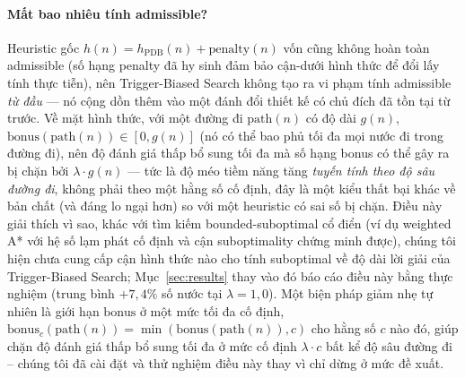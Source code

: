 \documentclass[10pt,conference]{article}
\begin{document}
\paragraph{Mất bao nhiêu tính admissible?} Heuristic gốc
$h(n) = h_{\mathrm{PDB}}(n) + \mathrm{penalty}(n)$ vốn cũng không hoàn
toàn admissible (số hạng penalty đã hy sinh đảm bảo cận-dưới hình thức
để đổi lấy tính thực tiễn), nên Trigger-Biased Search không tạo ra vi
phạm tính admissible \emph{từ đầu} — nó cộng dồn thêm vào một đánh đổi
thiết kế có chủ đích đã tồn tại từ trước. Về mặt hình thức, với một
đường đi $\mathrm{path}(n)$ có độ dài $g(n)$,
$\mathrm{bonus}(\mathrm{path}(n)) \in [0, g(n)]$ (nó có thể bao phủ tối
đa mọi nước đi trong đường đi), nên độ đánh giá thấp bổ sung tối đa mà
số hạng bonus có thể gây ra bị chặn bởi $\lambda \cdot g(n)$ — tức là
độ méo tiềm năng tăng \emph{tuyến tính theo độ sâu đường đi}, không
phải theo một hằng số cố định, đây là một kiểu thất bại khác về bản
chất (và đáng lo ngại hơn) so với một heuristic có sai số bị chặn. Điều
này giải thích vì sao, khác với tìm kiếm bounded-suboptimal cổ điển (ví
dụ weighted A* với hệ số lạm phát cố định và cận suboptimality chứng
minh được), chúng tôi hiện chưa cung cấp cận hình thức nào cho tính
suboptimal về độ dài lời giải của Trigger-Biased Search; Mục~\ref{sec:results}
thay vào đó báo cáo điều này bằng thực nghiệm (trung bình $+7,4\%$ số
nước tại $\lambda=1,0$). Một biện pháp giảm nhẹ tự nhiên là giới hạn $\mathrm{bonus}$ ở một
mức tối đa cố định,
$\mathrm{bonus}_c(\mathrm{path}(n)) = \min(\mathrm{bonus}(\mathrm{path}(n)),
c)$ cho hằng số $c$ nào đó, giúp chặn độ đánh giá thấp bổ sung tối đa ở
mức cố định $\lambda \cdot c$ bất kể độ sâu đường đi -- chúng tôi đã cài
đặt và thử nghiệm điều này thay vì chỉ dừng ở mức đề xuất.
\end{document}
